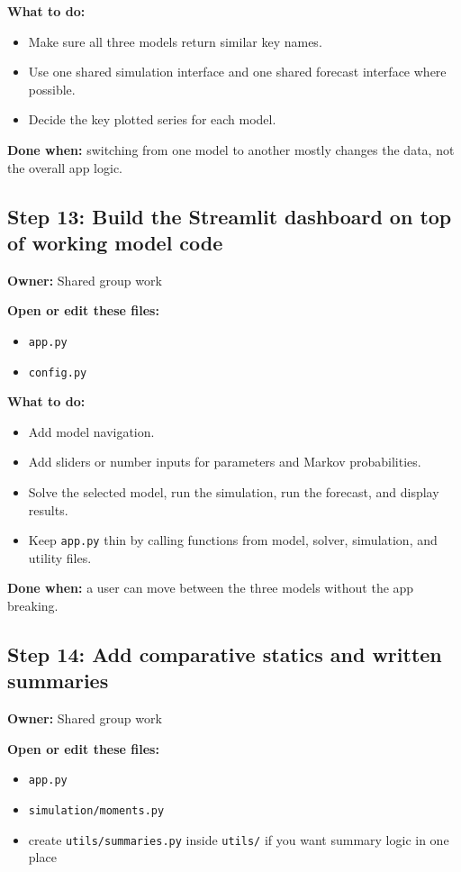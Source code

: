\documentclass[11pt]{article}
\begin{document}
\textbf{What to do:}
\begin{itemize}
    \item Make sure all three models return similar key names.
    \item Use one shared simulation interface and one shared forecast interface where possible.
    \item Decide the key plotted series for each model.
\end{itemize}

\textbf{Done when:} switching from one model to another mostly changes the data, not the overall app logic.

\subsection{Step 13: Build the Streamlit dashboard on top of working model code}
\textbf{Owner:} Shared group work

\textbf{Open or edit these files:}
\begin{itemize}
    \item \texttt{app.py}
    \item \texttt{config.py}
\end{itemize}

\textbf{What to do:}
\begin{itemize}
    \item Add model navigation.
    \item Add sliders or number inputs for parameters and Markov probabilities.
    \item Solve the selected model, run the simulation, run the forecast, and display results.
    \item Keep \texttt{app.py} thin by calling functions from model, solver, simulation, and utility files.
\end{itemize}

\textbf{Done when:} a user can move between the three models without the app breaking.

\subsection{Step 14: Add comparative statics and written summaries}
\textbf{Owner:} Shared group work

\textbf{Open or edit these files:}
\begin{itemize}
    \item \texttt{app.py}
    \item \texttt{simulation/moments.py}
    \item create \texttt{utils/summaries.py} inside \texttt{utils/} if you want summary logic in one place
\end{itemize}
\end{document}
